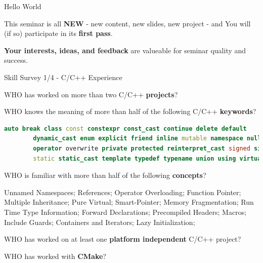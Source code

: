 \begin{frame}{Hello World}
	
	\center\Large
	This seminar is all \textbf{NEW} - new content, new slides, new project - and You will (if so) participate in its \textbf{first pass}.
	\vspace{1cm}
	
	\pause\small
	\textbf{Your interests, ideas, and feedback} are valueable for seminar quality and success.
	
\end{frame}



\begin{frame}[plain]
\end{frame}



\begin{frame}[fragile]{Skill Survey 1/4 - C/C++ Experience}
	
	\pause
	WHO has worked on more than two C/C++ \textbf{projects}?\bigskip

	\pause
	WHO knows the meaning of more than half of the following C/C++ \textbf{keywords}?
	\begin{lstlisting}[language=C++]
		auto break class const constexpr const_cast continue delete default 
		dynamic_cast enum explicit friend inline mutable namespace nullptr 
		operator overwrite private protected reinterpret_cast signed sizeof 
		static static_cast template typedef typename union using virtual void
	\end{lstlisting}\bigskip

	\pause
	WHO is familiar with more than half of the following \textbf{concepts}?
	
	\begin{scriptsize}
		Unnamed Namespaces; References; Operator Overloading; Function Pointer; Multiple Inheritance;
		Pure Virtual; Smart-Pointer; Memory Fragmentation; Run Time Type Information; Forward Declarations;
		Precompiled Headers; Macros; Include Guards; Containers and Iterators; Lazy Initialization;
	\end{scriptsize}\bigskip

	\pause
	WHO has worked on at least one \textbf{platform independent} C/C++ project?\bigskip

	\pause
	WHO has worked with \textbf{CMake}?

\end{frame}


